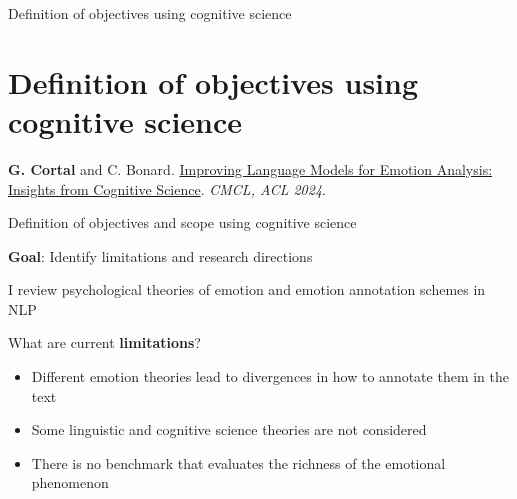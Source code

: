 \documentclass[handout,10pt]{beamer}
\begin{document}
\begin{frame}{}
\Large
\begin{center}
    Definition of objectives using cognitive science
    \section{Definition of objectives using cognitive science}
\end{center}
\vspace{1.5cm}

    \footnotesize

    \textbf{G. Cortal} and C. Bonard. \href{https://aclanthology.org/2024.cmcl-1.23/}{Improving Language Models for Emotion Analysis: Insights from Cognitive Science}. \textit{CMCL, ACL 2024}.
\end{frame}

\begin{frame}{Definition of objectives and scope using cognitive science}

\textbf{Goal}: Identify limitations and research directions

\pause
\vspace{0.5cm}

I review psychological theories of emotion and emotion annotation schemes in NLP

\pause
\vspace{0.5cm}

What are current \textbf{limitations}? 

\begin{itemize}[<+->]
    \item Different emotion theories lead to divergences in how to annotate them in the text
    \item Some linguistic and cognitive science theories are not considered
    \item There is no benchmark that evaluates the richness of the emotional phenomenon
\end{itemize}




    
\end{frame}
\end{document}
